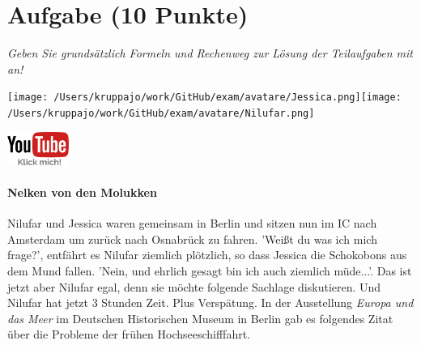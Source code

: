 \documentclass[a4paper, 9pt]{scrartcl}\usepackage[]{graphicx}\usepackage[]{xcolor}
\begin{document}
 
\clearpage

\section{Aufgabe \hfill (10 Punkte)}

\textit{Geben Sie grundsätzlich Formeln und Rechenweg zur Lösung der Teilaufgaben mit an!} \\[1Ex]
 

 
\ifcollection
\begin{flushright}
\tiny\vspace{-3Ex}
\textbf{\examinhaltstart}
\exammodulemathstat
\vspace{-4Ex}
\end{flushright}
\begin{minipage}[t]{0.5\textwidth}
\texttt{[image: /Users/kruppajo/work/GitHub/exam/avatare/Jessica.png]}\hspace{-4mm}\texttt{[image: /Users/kruppajo/work/GitHub/exam/avatare/Nilufar.png]}
\end{minipage}
\begin{minipage}[t]{0.5\textwidth}
\hfill
\href{https://youtu.be/1B53cVFIU7Q}{\includegraphics[width = 2cm]{img/youtube}}
\end{minipage}
\fi



\ifcollection
\paragraph{Nelken von den Molukken}
\fi



Nilufar und Jessica waren gemeinsam in Berlin und sitzen nun im IC nach Amsterdam um zurück nach Osnabrück zu fahren. 'Weißt du was ich mich frage?', entfährt es Nilufar ziemlich plötzlich, so dass Jessica die Schokobons aus dem Mund fallen. 'Nein, und ehrlich gesagt bin ich auch ziemlich müde...'. Das ist jetzt aber Nilufar egal, denn sie möchte folgende Sachlage diskutieren. Und Nilufar hat jetzt 3 Stunden Zeit. Plus Verspätung. In der Ausstellung \textit{Europa und das Meer} im Deutschen Historischen Museum in Berlin gab es folgendes Zitat über die Probleme der frühen Hochseeschifffahrt.
\end{document}
